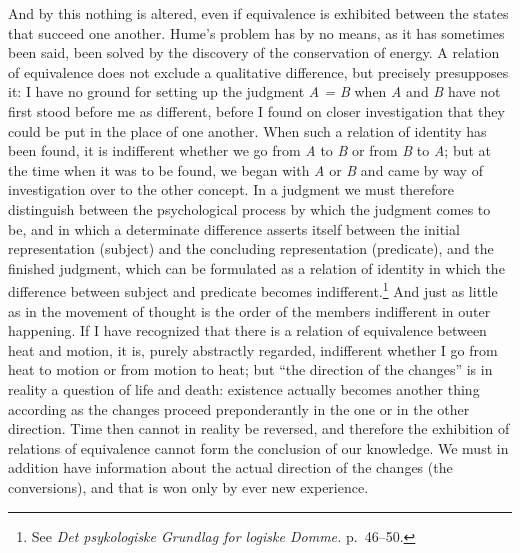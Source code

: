 \documentclass[12pt,a4paper]{book}
\newcommand{\opage}[1]{\marginnote{\footnotesize\textit{[#1]}}}
\begin{document}
And by this nothing is altered, even if equivalence is exhibited between the
states that succeed one another. Hume's problem has by no means, as it has
sometimes been said, been solved by the \opage{47}discovery of the conservation of energy.
A relation of equivalence does not exclude a qualitative difference, but
precisely presupposes it: I have no ground for setting up the judgment
\textit{A = B} when \textit{A} and \textit{B} have not first stood before me as
different, before I found on closer investigation that they could be put in the
place of one another. When such a relation of identity has been found, it is
indifferent whether we go from \textit{A} to \textit{B} or from \textit{B} to
\textit{A}; but at the time when it was to be found, we began with \textit{A} or
\textit{B} and came by way of investigation over to the other concept. In a
judgment we must therefore distinguish between the psychological process by which
the judgment comes to be, and in which a determinate difference asserts itself
between the initial representation (subject) and the concluding representation
(predicate), and the finished judgment, which can be formulated as a relation of
identity in which the difference between subject and predicate becomes
indifferent.\footnote{See \textit{Det psykologiske Grundlag for logiske Domme.}
p.~46--50.} And just as little as in the movement of thought is the order of the
members indifferent in outer happening. If I have recognized that there is a
relation of equivalence between heat and motion, it is, purely abstractly
regarded, indifferent whether I go from heat to motion or from motion to heat;
but ``the direction of the changes'' is in reality a question of life and death:
existence actually becomes another thing according as the changes proceed
preponderantly in the one or in the other direction. Time then cannot in reality
be reversed, and therefore the exhibition of relations of equivalence cannot form
the conclusion of our knowledge. We must in addition have information about the
actual direction of the changes (the conversions), and that is won only by ever
new experience.
\end{document}
